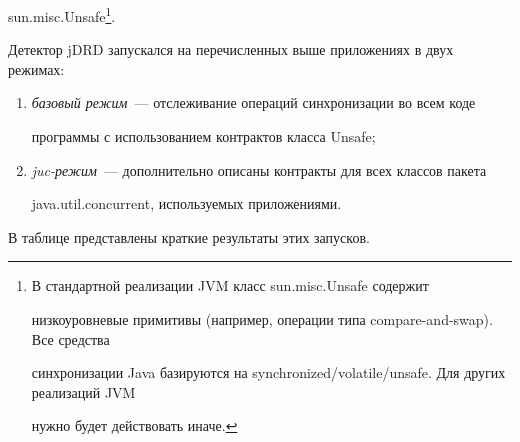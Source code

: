{\sf sun.misc.Unsafe}\footnote{В стандартной реализации JVM класс {\sf sun.misc.Unsafe} содержит

низкоуровневые примитивы (например, операции типа compare-and-swap). Все средства

синхронизации Java базируются на synchronized/volatile/unsafe. Для других реализаций JVM

нужно будет действовать иначе.}.





  Детектор jDRD запускался на перечисленных выше приложениях в двух режимах:

  \begin{enumerate}[(1)]

\item \textit{базовый режим}~--- отслеживание операций синхронизации во всем коде

программы с использованием контрактов класса {\sf Unsafe};

\item \textit{juc-режим}~--- дополнительно описаны контракты для всех классов пакета

{\sf java.util.concurrent}, используемых приложениями.

\end{enumerate}



В таблице представлены краткие результаты этих запусков.



